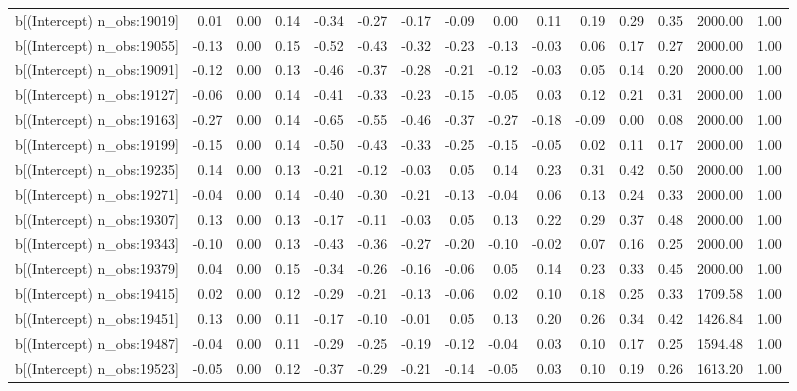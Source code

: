 \begin{table}[ht]
\begin{tabular}{rrrrrrrrrrrrrrr}
  b[(Intercept) n\_obs:19019] & 0.01 & 0.00 & 0.14 & -0.34 & -0.27 & -0.17 & -0.09 & 0.00 & 0.11 & 0.19 & 0.29 & 0.35 & 2000.00 & 1.00 \\ 
  b[(Intercept) n\_obs:19055] & -0.13 & 0.00 & 0.15 & -0.52 & -0.43 & -0.32 & -0.23 & -0.13 & -0.03 & 0.06 & 0.17 & 0.27 & 2000.00 & 1.00 \\ 
  b[(Intercept) n\_obs:19091] & -0.12 & 0.00 & 0.13 & -0.46 & -0.37 & -0.28 & -0.21 & -0.12 & -0.03 & 0.05 & 0.14 & 0.20 & 2000.00 & 1.00 \\ 
  b[(Intercept) n\_obs:19127] & -0.06 & 0.00 & 0.14 & -0.41 & -0.33 & -0.23 & -0.15 & -0.05 & 0.03 & 0.12 & 0.21 & 0.31 & 2000.00 & 1.00 \\ 
  b[(Intercept) n\_obs:19163] & -0.27 & 0.00 & 0.14 & -0.65 & -0.55 & -0.46 & -0.37 & -0.27 & -0.18 & -0.09 & 0.00 & 0.08 & 2000.00 & 1.00 \\ 
  b[(Intercept) n\_obs:19199] & -0.15 & 0.00 & 0.14 & -0.50 & -0.43 & -0.33 & -0.25 & -0.15 & -0.05 & 0.02 & 0.11 & 0.17 & 2000.00 & 1.00 \\ 
  b[(Intercept) n\_obs:19235] & 0.14 & 0.00 & 0.13 & -0.21 & -0.12 & -0.03 & 0.05 & 0.14 & 0.23 & 0.31 & 0.42 & 0.50 & 2000.00 & 1.00 \\ 
  b[(Intercept) n\_obs:19271] & -0.04 & 0.00 & 0.14 & -0.40 & -0.30 & -0.21 & -0.13 & -0.04 & 0.06 & 0.13 & 0.24 & 0.33 & 2000.00 & 1.00 \\ 
  b[(Intercept) n\_obs:19307] & 0.13 & 0.00 & 0.13 & -0.17 & -0.11 & -0.03 & 0.05 & 0.13 & 0.22 & 0.29 & 0.37 & 0.48 & 2000.00 & 1.00 \\ 
  b[(Intercept) n\_obs:19343] & -0.10 & 0.00 & 0.13 & -0.43 & -0.36 & -0.27 & -0.20 & -0.10 & -0.02 & 0.07 & 0.16 & 0.25 & 2000.00 & 1.00 \\ 
  b[(Intercept) n\_obs:19379] & 0.04 & 0.00 & 0.15 & -0.34 & -0.26 & -0.16 & -0.06 & 0.05 & 0.14 & 0.23 & 0.33 & 0.45 & 2000.00 & 1.00 \\ 
  b[(Intercept) n\_obs:19415] & 0.02 & 0.00 & 0.12 & -0.29 & -0.21 & -0.13 & -0.06 & 0.02 & 0.10 & 0.18 & 0.25 & 0.33 & 1709.58 & 1.00 \\ 
  b[(Intercept) n\_obs:19451] & 0.13 & 0.00 & 0.11 & -0.17 & -0.10 & -0.01 & 0.05 & 0.13 & 0.20 & 0.26 & 0.34 & 0.42 & 1426.84 & 1.00 \\ 
  b[(Intercept) n\_obs:19487] & -0.04 & 0.00 & 0.11 & -0.29 & -0.25 & -0.19 & -0.12 & -0.04 & 0.03 & 0.10 & 0.17 & 0.25 & 1594.48 & 1.00 \\ 
  b[(Intercept) n\_obs:19523] & -0.05 & 0.00 & 0.12 & -0.37 & -0.29 & -0.21 & -0.14 & -0.05 & 0.03 & 0.10 & 0.19 & 0.26 & 1613.20 & 1.00 \\ 

\end{tabular}
\end{table}
